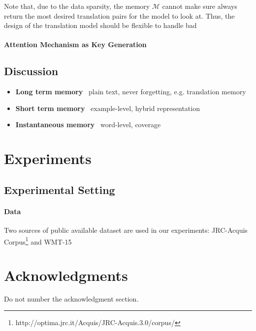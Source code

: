 \documentclass[11pt,letterpaper]{article}
\begin{document}
Note that, due to the data sparsity, the memory $\mathcal{M}$ cannot make sure always return the most desired translation pairs for the model to look at. Thus, the design of the translation model should be flexible to handle bad 
\paragraph{Attention Mechanism as Key Generation}
\subsection{Discussion}
\begin{itemize}
\item \textbf{Long term memory}~ plain text, never forgetting, e.g. translation memory
\item \textbf{Short term memory}~ example-level, hybrid representation
\item \textbf{Instantaneous memory}~ word-level, coverage
\end{itemize}


\section{Experiments}
\subsection{Experimental Setting}
\paragraph{Data} Two sources of public available dataset are used in our experiments: JRC-Acquis Corpus\footnote{http://optima.jrc.it/Acquis/JRC-Acquis.3.0/corpus/} and WMT-15

\section*{Acknowledgments}

Do not number the acknowledgment section.



\end{document}
